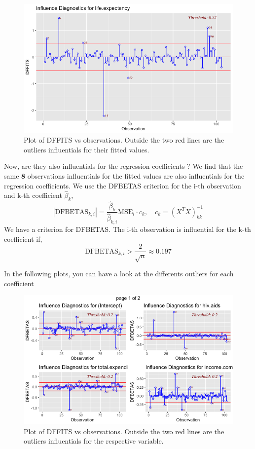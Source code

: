 \begin{figure}[H]
	\centering
	\includegraphics{figures/models/dffits.png}
	\caption{Plot of DFFITS vs observations. Outside the two red lines are the outliers influentials for their fitted values.}
	\label{fig:dffits}
\end{figure}

Now, are they also influentials for the regression coefficients ? We find that the same $\textbf{8}$ observations influentials for the fitted values are also influentials for the regression coefficients. We use the DFBETAS criterion for the i-th observation and k-th coefficient $\hat{\beta}_k$, 
\begin{equation}
	|\text{DFBETAS}_{k,i}| = \frac{\hat{\beta}_k}{\hat{\beta}_{k,i}}{\text{MSE}_i \cdot c_k}, \quad c_k = (X^T X)^{-1}_{kk}
\end{equation}
We have a criterion for DFBETAS. The i-th observation is influential for the k-th coefficient if, 
\begin{equation}
	\text{DFBETAS}_{k,i} > \frac{2}{\sqrt{n}} \approx 0.197
\end{equation}

In the following plots, you can have a look at the differents outliers for each coefficient
\begin{figure}[H]
	\centering
	\includegraphics{figures/models/dfbetas_1.png}
	\caption{Plot of DFFITS vs observations. Outside the two red lines are the outliers influentials for the respective variable.}
	\label{fig:dfbetas1}
\end{figure}

